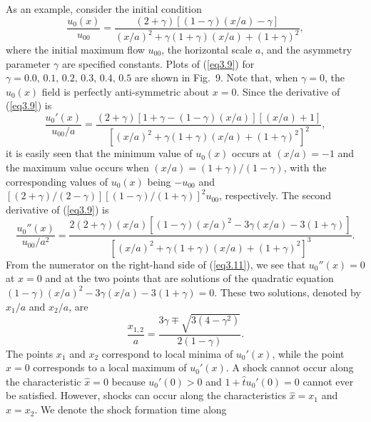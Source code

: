 \documentclass[10pt]{article}
\begin{document}
     As an example, consider the initial condition
\begin{equation}                                 %
   \frac{u_0(x)}{u_{00}} = \frac{(2+\gamma)[(1-\gamma)(x/a)-\gamma]}
	                        {(x/a)^2+\gamma(1+\gamma)(x/a)+(1+\gamma)^2},
\label{eq3.9}
\end{equation}
where the initial maximum flow $u_{00}$, the horizontal scale $a$, and
the asymmetry parameter $\gamma$ are specified constants. Plots of
(\ref{eq3.9}) for $\gamma=0.0,\, 0.1,\, 0.2,\, 0.3,\, 0.4,\, 0.5$ are
shown in Fig.~9. Note that, when $\gamma=0$, the $u_0(x)$ field is perfectly
anti-symmetric about $x=0$. Since the derivative of (\ref{eq3.9}) is
\begin{equation}                                 %
   \frac{u_0'(x)}{u_{00}/a} = \frac{(2+\gamma)[1+\gamma-(1-\gamma)(x/a)][(x/a)+1]}
	                           {[(x/a)^2+\gamma(1+\gamma)(x/a)+(1+\gamma)^2]^2},
\label{eq3.10}
\end{equation}
it is easily seen that the minimum value of $u_0(x)$ occurs at
$(x/a)=-1$ and the maximum value occurs when $(x/a)=(1+\gamma)/(1-\gamma)$,
with the corresponding values of $u_0(x)$ being $-u_{00}$ and
$[(2+\gamma)/(2-\gamma)][(1-\gamma)/(1+\gamma)]^2 u_{00}$, respectively.
The second derivative of (\ref{eq3.9}) is
\begin{equation}                                 %
   \frac{u_0''(x)}{u_{00}/a^2}
           = \frac{2(2+\gamma)(x/a)[(1-\gamma)(x/a)^2-3\gamma (x/a)-3(1+\gamma)]}
                  {[(x/a)^2+\gamma(1+\gamma)(x/a)+(1+\gamma)^2]^3}.
\label{eq3.11}
\end{equation}
From the numerator on the right-hand side of (\ref{eq3.11}), we
see that $u_0''(x)=0$ at $x=0$ and at the two points that are
solutions of the quadratic equation $(1-\gamma)(x/a)^2-3\gamma (x/a)-3(1+\gamma)=0$.
These two solutions, denoted by $x_1/a$ and $x_2/a$, are
\begin{equation}                                 %
      \frac{x_{1,2}}{a} = \frac{3\gamma\mp\sqrt{3(4-\gamma^2)}}{2(1-\gamma)}.
\label{eq3.12}
\end{equation}
The points $x_1$ and $x_2$ correspond
to local minima of $u_0'(x)$, while the point $x=0$ corresponds to a
local maximum of $u_0'(x)$.  A shock cannot occur along the
characteristic $\hat{x}=0$ because $u_0'(0)>0$ and $1+\hat{t}u_0'(0)=0$
cannot ever be satisfied. However, shocks can occur along the characteristics
$\hat{x}=x_1$ and $\hat{x}=x_2$. We denote the shock formation time along
\end{document}
